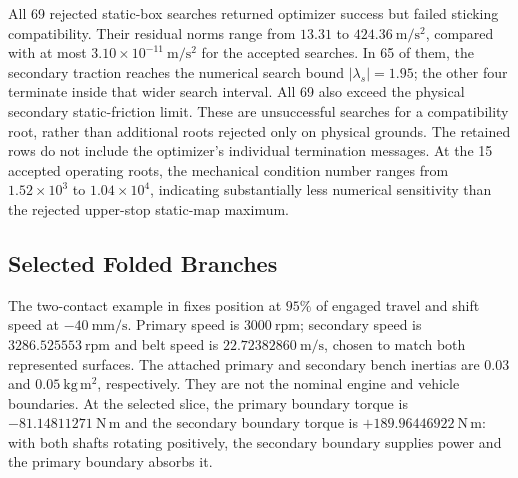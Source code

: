 \documentclass[11pt]{report}
\numberwithin{equation}{section}
\begin{document}
All 69 rejected static-box searches returned optimizer success but failed
sticking compatibility. Their residual norms range from
\(13.31\) to \(424.36~\mathrm{m/s^2}\), compared with at most
\(3.10\times10^{-11}~\mathrm{m/s^2}\) for the accepted searches.
In 65 of them, the secondary traction reaches the numerical search bound
\(\lvert\lambda_s\rvert=1.95\); the other four terminate inside that
wider search interval. All 69 also exceed the physical secondary
static-friction limit. These are unsuccessful searches for a compatibility
root, rather than additional roots rejected only on physical grounds.
The retained rows do not include the optimizer's individual termination
messages. At the 15 accepted operating roots, the mechanical condition
number ranges from \(1.52\times10^3\) to \(1.04\times10^4\), indicating
substantially less numerical sensitivity than the rejected upper-stop
static-map maximum.
\FloatBarrier

\subsection{Selected Folded Branches}

The two-contact example in  fixes
position at \(95\%\) of engaged travel and shift speed at
\(-40~\mathrm{mm/s}\). Primary speed is \(3000~\mathrm{rpm}\);
secondary speed is \(3286.525553~\mathrm{rpm}\) and belt speed is
\(22.72382860~\mathrm{m/s}\), chosen to match both represented surfaces.
The attached primary and secondary bench inertias are
\(0.03\) and \(0.05~\mathrm{kg\,m^2}\), respectively. They are not the
nominal engine and vehicle boundaries. At the selected slice, the primary
boundary torque is \(-81.14811271~\mathrm{N\,m}\) and the secondary
boundary torque is \(+189.96446922~\mathrm{N\,m}\): with both shafts
rotating positively, the secondary boundary supplies power and the primary
boundary absorbs it.
\end{document}
